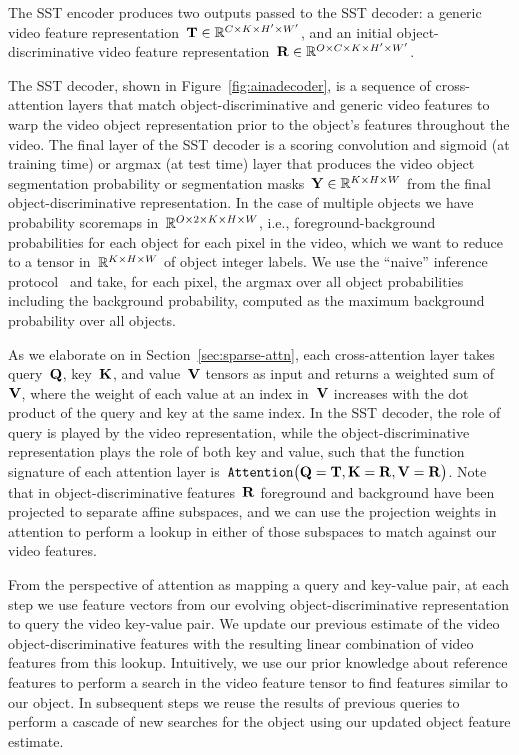 The SST encoder produces two outputs passed to the SST decoder: a generic video
feature representation~$\mathbf{T}{}\in\mathbb{R}{}^{C\times K \times H'\times W'}$,
and an initial object-discriminative video feature
representation~$\mathbf{R}{}\in\mathbb{R}{}^{O\times C\times K \times H'\times W'}$.

The SST decoder, shown in Figure~\ref{fig:ainadecoder}, is a sequence of
cross-attention layers that match object-discriminative and generic video
features to warp the video object representation prior to the object's features
throughout the video.
The final layer of the SST decoder is a scoring convolution and sigmoid (at
training time) or argmax (at test time) layer that produces the video object
segmentation probability or segmentation
masks~$\mathbf{Y}{} \in \mathbb{R}{}^{K\times H\times W}$ from the final
object-discriminative representation.
In the case of multiple objects we have probability scoremaps
in~$\mathbb{R}{}^{O\times 2\times K\times H\times W}$, i.e., foreground-background
probabilities for each object for each pixel in the video, which we want to
reduce to a tensor in~$\mathbb{R}{}^{K\times H\times W}$ of object integer labels.
We use the ``naive'' inference protocol~\cite{oh2018fast} and take, for each
pixel, the argmax over all object probabilities including the background
probability, computed as the maximum background probability over all objects.

As we elaborate on in Section~\ref{sec:sparse-attn}, each cross-attention layer
takes query~$\mathbf{Q}{}$, key~$\mathbf{K}{}$, and value~$\mathbf{V}{}$
tensors as input and returns a weighted sum of~$\mathbf{V}{}$, where the
weight of each value at an index in~$\mathbf{V}{}$ increases with the dot
product of the query and key at the same index.
In the SST decoder, the role of query is played by the video representation,
while the object-discriminative representation plays the role of both key and
value, such that the function signature of each attention layer
is~$\mathtt{Attention}\big(\mathbf{Q}{} = \mathbf{T}{}, \mathbf{K}{} = \mathbf{R}{}, \mathbf{V}{} = \mathbf{R}{}\big)$.
Note that in object-discriminative features~$\mathbf{R}{}$ foreground and
background have been projected to separate affine subspaces, and we can use the
projection weights in attention to perform a lookup in either of those
subspaces to match against our video features.

From the perspective of attention as mapping a query and key-value pair, at
each step we use feature vectors from our evolving object-discriminative
representation to query the video key-value pair.
We update our previous estimate of the video object-discriminative features
with the resulting linear combination of video features from this lookup.
Intuitively, we use our prior knowledge about reference features to perform a
search in the video feature tensor to find features similar to our object.
In subsequent steps we reuse the results of previous queries to perform a
cascade of new searches for the object using our updated object feature
estimate.

